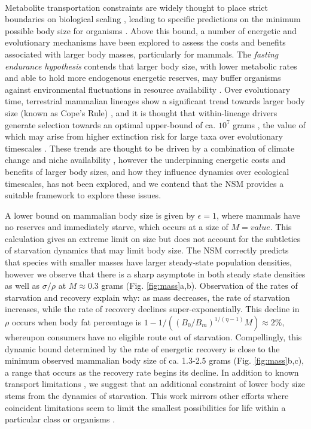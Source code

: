 \documentclass{pnastwo}
\begin{document}
\begin{article}
\vspace{2mm}
 \\ \nonumber
Metabolite transportation constraints are widely thought to place strict boundaries on biological scaling \cite{Brown:1993p708,West:1997cg,Brown:2004wq}, leading to specific predictions on the minimum possible body size for organisms \cite{West:2002ud}.
Above this bound, a number of energetic and evolutionary mechanisms have been explored to assess the costs and benefits associated with larger body masses, particularly for mammals.
The \emph{fasting endurance hypothesis} contends that larger body size, with lower metabolic rates and able to hold more endogenous energetic reserves, may buffer organisms against environmental fluctuations in resource availability \cite{Millar:1990p923}.
Over evolutionary time, terrestrial mammalian lineages show a significant trend towards larger body size (known as Cope's Rule) \cite{Alroy:1998p1594,Clauset:2009fh,Smith:2010p3442,Saarinen:2014br}, and it is thought that within-lineage drivers generate selection towards an optimal upper-bound of ca. $10^7$ grams \cite{Alroy:1998p1594}, the value of which may arise from higher extinction risk for large taxa over evolutionary timescales \cite{Clauset:2009fh}.
These trends are thought to be driven by a combination of climate change and niche availability \cite{Saarinen:2014br}, however the underpinning energetic costs and benefits of larger body sizes, and how they influence dynamics over ecological timescales, has not been explored, and we contend that the NSM provides a suitable framework to explore these issues.

A lower bound on mammalian body size is given by $\epsilon=1$, where mammals have no reserves and immediately starve, which occurs at a size of $M=value$. This calculation gives an extreme limit on size but does not account for the subtleties of starvation dynamics that may limit body size. The NSM correctly predicts that species with smaller masses have larger steady-state population densities, however we observe that there is a sharp asymptote in both steady state densities as well as $\sigma/\rho$ at $M \approx 0.3$ grams  (Fig. \ref{fig:mass}a,b).
Observation of the rates of starvation and recovery explain why: as mass decreases, the rate of starvation increases, while the rate of recovery declines super-exponentially.
This decline in $\rho$ occurs when body fat percentage is $1 - 1/(\left(B_{0}/B_{m}\right)^{1/\left(\eta-1\right)}M) \approx 2\%$, whereupon consumers have no eligible route out of starvation.
Compellingly, this dynamic bound determined by the rate of energetic recovery is close to the minimum observed mammalian body size of ca. 1.3-2.5 grams (Fig. \ref{fig:mass}b,c), a range that occurs as the recovery rate begins its decline.
In addition to known transport limitations \cite{West:2002ud}, we suggest that an additional constraint of lower body size stems from the dynamics of starvation. This work mirrors other efforts where coincident limitations seem to limit the smallest possibilities for life within a particular class or organisms \cite{kempes}. 


\end{article}
\end{document}

